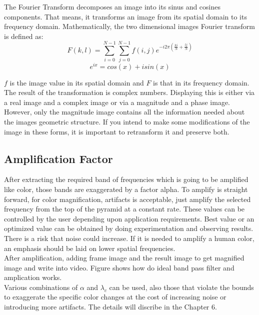 The Fourier Transform \cite{Bracewell} decomposes an image into its sinus and cosines components. That means, it transforms an image from its spatial domain to its frequency domain. Mathematically, the two dimensional images Fourier transform is defined as:
\begin{displaymath}
F\left ( k,l \right )=\sum_{i=0}^{N-1}\sum_{j=0}^{N-1}f\left ( i,j \right )e^{-i2\pi \left ( \frac{ki}{N}+ \frac{lj}{N} \right )}
\end{displaymath}
\begin{displaymath}
e^{ix}=cos\left ( x \right )+isin\left ( x \right )
\end{displaymath}

$f$ is the image value in its spatial domain and $F$ is that in its frequency domain. The result of the transformation is complex numbers. Displaying this is either via a real image and a complex image or via a magnitude and a phase image. However, only the magnitude image contains all the information needed about the images geometric structure. If you intend to make some modifications of the image in these forms, it is important to retransform it and preserve both.\\



\subsection{Amplification Factor}
After extracting the required band of frequencies which is going to be amplified like color, those bands are exaggerated by a factor alpha. To amplify is straight forward, for color magnification, artifacts is acceptable, just amplify the selected frequency from the top of the pyramid at a constant rate. These values can be controlled by the user depending upon application requirements. Best value or an optimized value can be obtained by doing experimentation and observing results. There is a risk that noise could increase. If it is needed to amplify a human color, an emphasis should be laid on lower spatial frequencies. \\

After amplification, adding frame image and the result image to get magnified image and write into video. Figure shows how do ideal band pass filter and amplication works.\\

Various combinations of $\alpha$ and $\lambda_{c}$ can be used, also those that violate the bounds to exaggerate the specific color changes at the cost of increasing noise or introducing more artifacts. The details will discribe in the Chapter 6.\\


